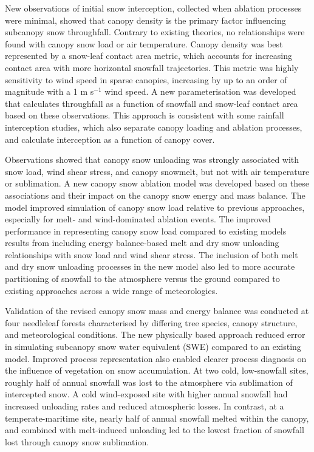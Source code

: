 {New observations of initial snow interception, collected when ablation processes were minimal, showed that canopy density is the primary factor influencing subcanopy snow throughfall. Contrary to existing theories, no relationships were found with canopy snow load or air temperature. Canopy density was best represented by a snow-leaf contact area metric, which accounts for increasing contact area with more horizontal snowfall trajectories. This metric was highly sensitivity to wind speed in sparse canopies, increasing by up to an order of magnitude with a 1 m s$^{-1}$ wind speed. A new parameterisation was developed that calculates throughfall as a function of snowfall and snow-leaf contact area based on these observations. This approach is consistent with some rainfall interception studies, which also separate canopy loading and ablation processes, and calculate interception as a function of canopy cover.

Observations showed that canopy snow unloading was strongly associated with snow load, wind shear stress, and canopy snowmelt, but not with air temperature or sublimation. A new canopy snow ablation model was developed based on these associations and their impact on the canopy snow energy and mass balance. The model improved simulation of canopy snow load relative to previous approaches, especially for melt- and wind-dominated ablation events. The improved performance in representing canopy snow load compared to existing models results from including energy balance-based melt and dry snow unloading relationships with snow load and wind shear stress. The inclusion of both melt and dry snow unloading processes in the new model also led to more accurate partitioning of snowfall to the atmosphere versus the ground compared to existing approaches across a wide range of meteorologies.

Validation of the revised canopy snow mass and energy balance was conducted at four needleleaf forests characterised by differing tree species, canopy structure, and meteorological conditions. The new physically based approach reduced error in simulating subcanopy snow water equivalent (SWE) compared to an existing model. Improved process representation also enabled clearer process diagnosis on the influence of vegetation on snow accumulation. At two cold, low-snowfall sites, roughly half of annual snowfall was lost to the atmosphere via sublimation of intercepted snow. A cold wind-exposed site with higher annual snowfall had increased unloading rates and reduced atmospheric losses. In contrast, at a temperate-maritime site, nearly half of annual snowfall melted within the canopy, and combined with melt-induced unloading led to the lowest fraction of snowfall lost through canopy snow sublimation.

}
